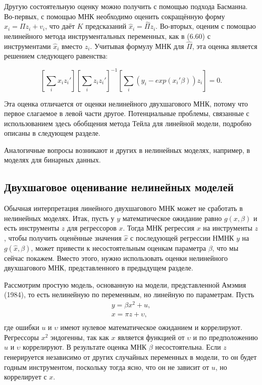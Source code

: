 Другую состоятельную оценку можно получить с помощью подхода Басманна. Во-первых, с помощью МНК необходимо оценить сокращённую форму $x_i = \Pi z_i + v_i$, что даёт $K$ предсказаний $\hat{x}_i = \hat{\Pi}z_i$. Во-вторых, оценим с помощью нелинейного метода инструментальных переменных, как в (6.60) с инструментами $\hat{x}_i$ вместо $z_i$. Учитывая формулу МНК для $\hat{\Pi}$, эта оценка является решением следующего равенства: 

\[
\left[ \sum_i x_iz_i' \right] \left[ \sum_i z_iz_i' \right]^{-1} \left[ \sum_i (y_i - exp(x_i'\beta))z_i \right] = 0.
\]

Эта оценка отличается от оценки нелинейного двухшагового МНК, потому что первое слагаемое в левой части другое. Потенциальные проблемы, связанные с использованием здесь обобщения метода Тейла для линейной модели, подробно описаны в следующем разделе.

Аналогичные вопросы возникают и других в нелинейных моделях, например, в моделях для бинарных данных.

\subsection{Двухшаговое оценивание нелинейных моделей}

Обычная интерпретация линейного двухшагового МНК может не сработать в нелинейных моделях. Итак, пусть у $y$ математическое ожидание равно $g(x,\beta)$ и есть инструменты $z$ для регрессоров $x$. Тогда МНК регрессия $x$ на инструменты $z$, чтобы получить оценённые значения $\hat{x}$ с последующей регрессии НМНК $y$ на $g(\hat{x},\beta)$, может привести к несостоятельным оценкам параметра $\beta$, что мы сейчас покажем. Вместо этого, нужно использовать оценки нелинейного двухшагового МНК, представленного в предыдущем разделе.

Рассмотрим простую модель, основанную на модели, представленной Амэмия (1984), то есть нелинейную по переменным, но линейную по параметрам. Пусть
\begin{equation}
\begin{split}
y=\beta x^2 +u, \\
x=\pi z + \upsilon,\\
\end{split}
\end{equation}
где ошибки $u$ и $\upsilon$ имеют нулевое математическое ожиданием и коррелируют. Регрессоры $x^2$ эндогенны, так как $x$ является функцией от $\upsilon$ и по предположению $u$ и $\upsilon$ коррелируют. В результате оценка МНК $\beta$ несостоятельна. Если $z$ генерируется независимо от других случайных переменных в модели, то он будет годным инструментом, поскольку тогда ясно, что он не зависит от $u$, но коррелирует с $x$. 


